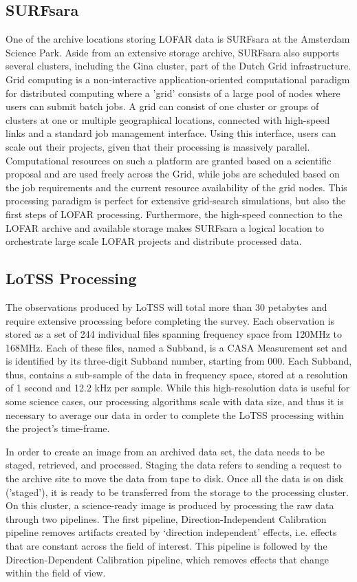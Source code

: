 \subsection{SURFsara} 

One of the archive locations storing LOFAR data is SURFsara at the Amsterdam Science Park. Aside from an extensive storage archive, SURFsara also supports several clusters, including the Gina cluster, part of the Dutch Grid infrastructure. Grid computing is a non-interactive application-oriented computational paradigm for distributed computing where a 'grid' consists of a large pool of nodes where users can submit batch jobs. A grid can consist of one cluster or groups of clusters at one or multiple geographical locations, connected with high-speed links and a standard job management interface. Using this interface, users can scale out their projects, given that their processing is massively parallel. Computational resources on such a platform are granted based on a scientific proposal and are used freely across the Grid, while jobs are scheduled based on the job requirements and the current resource availability of the grid nodes. This processing paradigm is perfect for extensive grid-search simulations, but also the first steps of LOFAR processing. Furthermore, the high-speed connection to the LOFAR archive  and available storage makes SURFsara a logical location to orchestrate large scale LOFAR projects and distribute processed data.


\subsection{LoTSS Processing}

The observations produced by LoTSS will total more than 30 petabytes and require extensive processing before completing the survey. Each observation is stored as a set of 244 individual files spanning frequency space from 120MHz to 168MHz. Each of these files, named a Subband, is a CASA Measurement set and is identified by its three-digit Subband number, starting from 000. Each Subband, thus, contains a sub-sample of the data in frequency space, stored at a resolution of 1 second and 12.2 kHz per sample. While this high-resolution data is useful for some science cases, our processing algorithms scale with data size, and thus it is necessary to average our data in order to complete the LoTSS processing within the project's time-frame. 

In order to create an image from an archived data set, the data needs to be staged, retrieved, and processed. Staging the data refers to sending a request to the archive site to move the data from tape to disk. Once all the data is on disk ('staged'), it is ready to be transferred from the storage to the processing cluster. On this cluster, a science-ready image is produced by processing the raw data through two pipelines. The first pipeline, Direction-Independent Calibration pipeline removes artifacts created by `direction independent' effects, i.e. effects that are constant across the field of interest. This pipeline is followed by the Direction-Dependent Calibration pipeline, which removes effects that change within the field of view.
 
